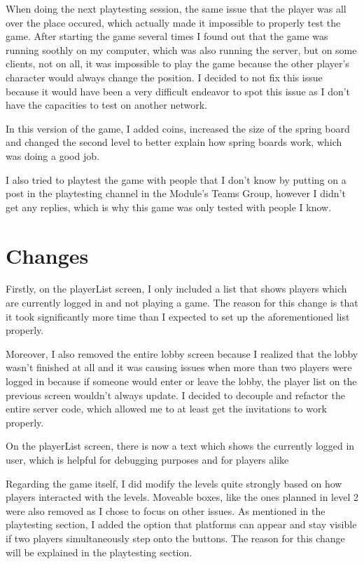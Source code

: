 \documentclass{article}
\begin{document}
\bigskip
When doing the next playtesting session, the same issue that the player was all over the place occured, which actually made it impossible to properly test the game. After starting the game several times I found out that the game was running soothly on my computer, which was also running the server, but on some clients, not on all, it was impossible to play the game because the other player's character would always change the position. I decided to not fix this issue because it would have been a very difficult endeavor to spot this issue as I don't have the capacities to test on another network.

In this version of the game, I added coins, increased the size of the spring board and changed the second level to better explain how spring boards work, which was doing a good job.

\bigskip
I also tried to playtest the game with people that I don't know by putting on a post in the playtesting channel in the Module's Teams Group, however I didn't get any replies, which is why this game was only tested with people I know.


\section{Changes}
Firstly, on the playerList screen, I only included a list that shows players which are currently logged in and not playing a game. The reason for this change is that it took significantly more time than I expected to set up the aforementioned list properly. 

\bigskip
Moreover, I also removed the entire lobby screen because I realized that the lobby wasn't finished at all and it was causing issues when more than two players were logged in because if someone would enter or leave the lobby, the player list on the previous screen wouldn't always update. I decided to decouple and refactor the entire server code, which allowed me to at least get the invitations to work properly. 

\bigskip
On the playerList screen, there is now a text which shows the currently logged in user, which is helpful for debugging purposes and for players alike

\bigskip
Regarding the game itself, I did modify the levels quite strongly based on how players interacted with the levels. Moveable boxes, like the ones planned in level 2 were also removed as I chose to focus on other issues. As mentioned in the playtesting section, I added the option that platforms can appear and stay visible if two players simultaneously step onto the buttons. The reason for this change will be explained in the playtesting section.
\end{document}
